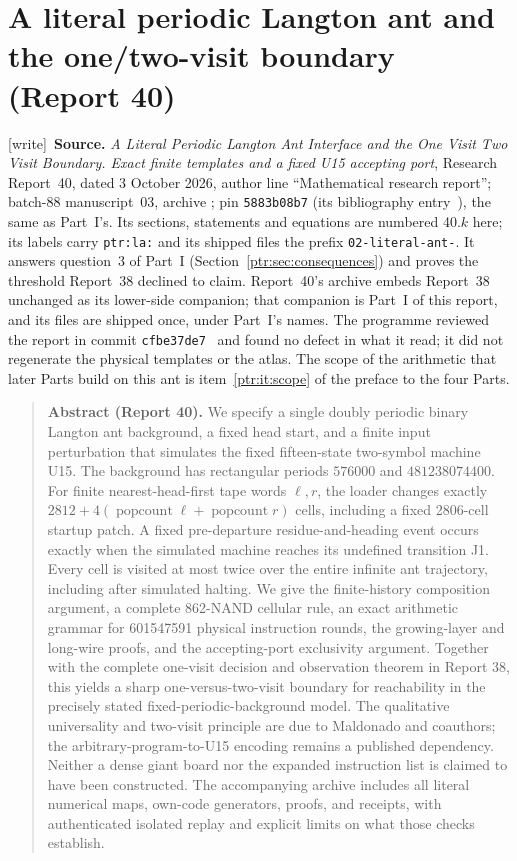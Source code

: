 \documentclass[11pt,letterpaper]{article}
\makeatletter
\newcommand{\ptrhead}{Front matter}
\theoremstyle{definition}\newtheorem{definition}[theorem]{Definition}
\theoremstyle{remark}\newtheorem{remark}[theorem]{Remark}
\newcommand{\ptrR}{}
\newcommand{\ptrstart}[2]{%
  \renewcommand{\ptrR}{#1}\setcounter{section}{0}\setcounter{equation}{0}%
  \def\Hy@chapapp{section}%
  \renewcommand{\thesection}{#1.\arabic{section}}%
  \renewcommand{\theHsection}{#1.\arabic{section}}%
  \renewcommand{\theequation}{#1.\arabic{equation}}%
  \renewcommand{\theHequation}{#1.\arabic{equation}}%
  \renewcommand{\ptrhead}{#2}}
\newcommand{\pop}{\operatorname{popcount}}
\newcommand{\wtag}{\textup{[write]}}
\makeatother
\begin{document}
\part{A literal periodic Langton ant and the one/two-visit boundary (Report 40)}\label{ptr:part:la}
\ptrstart{40}{Part II: Report 40}
\label{ptr:la:sec:intro}
\noindent\wtag\ \textbf{Source.} \emph{A Literal Periodic Langton Ant Interface
and the One Visit Two Visit Boundary. Exact finite templates and a fixed U15
accepting port}, Research Report~40, dated 3 October 2026, author line
``Mathematical research report''; batch-88 manuscript~03, archive
; pin
\texttt{5883b08b7} (its bibliography entry~\cite{ptr:la:arithmetic}), the
same as Part~I's. Its sections, statements and equations are numbered 40.$k$
here; its labels carry \texttt{ptr:la:} and its shipped files the prefix
\texttt{02-literal-ant-}. It answers question~3 of Part~I
(Section~\ref{ptr:sec:consequences}) and proves the threshold Report~38
declined to claim. Report~40's archive embeds Report~38 unchanged as its
lower-side companion; that companion is Part~I of this report, and its files
are shipped once, under Part~I's names. The programme reviewed the report in
commit \texttt{cfbe37de7}~\cite{ptr:w:rev4048} and found no defect in what it
read; it did not regenerate the physical templates or the atlas. The scope of
the arithmetic that later Parts build on this ant is item~\ref{ptr:it:scope}
of the preface to the four Parts.

\begin{quote}\small\noindent\textbf{Abstract (Report 40).} We specify a single doubly periodic binary Langton ant background, a fixed head start, and a finite input perturbation that simulates the fixed fifteen-state two-symbol machine U15. The background has rectangular periods $576000$ and $481238074400$. For finite nearest-head-first tape words $\ell,r$, the loader changes exactly $2812+4(\pop\ell+\pop r)$ cells, including a fixed 2806-cell startup patch. A fixed pre-departure residue-and-heading event occurs exactly when the simulated machine reaches its undefined transition J1. Every cell is visited at most twice over the entire infinite ant trajectory, including after simulated halting. We give the finite-history composition argument, a complete 862-NAND cellular rule, an exact arithmetic grammar for 601547591 physical instruction rounds, the growing-layer and long-wire proofs, and the accepting-port exclusivity argument. Together with the complete one-visit decision and observation theorem in Report 38, this yields a sharp one-versus-two-visit boundary for reachability in the precisely stated fixed-periodic-background model. The qualitative universality and two-visit principle are due to Maldonado and coauthors; the arbitrary-program-to-U15 encoding remains a published dependency. Neither a dense giant board nor the expanded instruction list is claimed to have been constructed. The accompanying archive includes all literal numerical maps, own-code generators, proofs, and receipts, with authenticated isolated replay and explicit limits on what those checks establish.
\end{quote}
\end{document}
